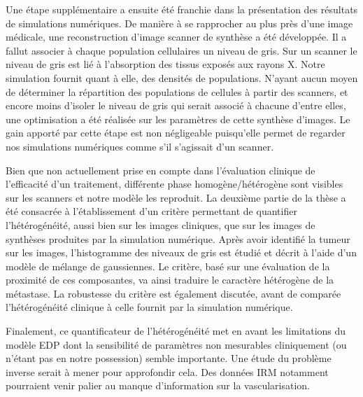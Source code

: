 \documentclass[12pt,a4paper]{article}
\newcommand{\hetero}{hétérogénéité\xspace}
\newcommand{\heterogene}{hétérogène\xspace}
\newcommand{\twinweno}{twin-WENO5\xspace}
\begin{document}


Une étape supplémentaire a ensuite été franchie dans la présentation des résultats de simulations numériques. 
De manière à se rapprocher au plus près d'une image médicale,  une reconstruction d'image scanner de synthèse a été développée. 
Il a fallut associer à chaque population cellulaires un niveau de gris. 
Sur un scanner le niveau de gris est lié à l'absorption des tissus exposés aux rayons X. 
Notre simulation fournit quant à elle, des densités de populations. N'ayant aucun moyen de déterminer la répartition des populations de cellules à partir des scanners, et encore moins d'isoler le niveau de gris qui serait associé à chacune d'entre elles, une optimisation a été réalisée sur les paramètres de cette synthèse d'images. 
Le gain apporté par cette étape est non négligeable puisqu'elle permet %
de regarder nos simulations numériques comme s'il 
s'agissait d'un scanner. 


Bien que non actuellement prise en compte dans l'évaluation clinique de l'efficacité d'un traitement, différente phase homogène/\heterogene sont visibles sur les scanners et notre modèle les reproduit.
La deuxième partie de la thèse a été consacrée à l'établissement d'un critère permettant de quantifier l'\hetero, aussi bien sur les images cliniques, que sur les images de synthèses produites par la simulation numérique. 
Après avoir identifié la tumeur sur les images, l'histogramme des niveaux de gris est étudié et décrit à l'aide 
d'un modèle de mélange de gaussiennes. 
Le critère, basé sur une évaluation de la proximité de ces %
composantes, va ainsi traduire le caractère \heterogene de la métastase. 
La robustesse du critère est également discutée, avant de comparée l'\hetero clinique à celle fournit par la simulation numérique. 


Finalement, ce quantificateur de l'\hetero met en avant les limitations du modèle EDP dont la sensibilité de paramètres non mesurables cliniquement (ou n'étant pas en notre possession) semble importante. Une étude du problème inverse serait à mener pour approfondir cela. Des données IRM notamment pourraient venir palier au manque d'information sur la vascularisation.
\end{document}
